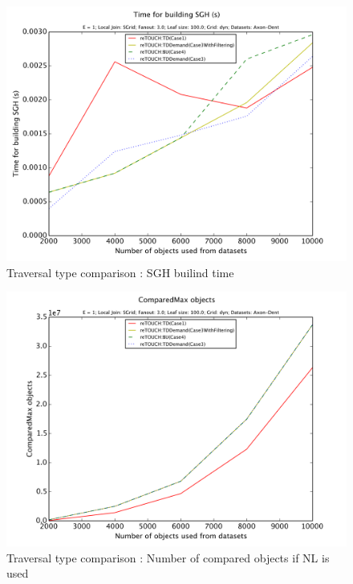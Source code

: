 \documentclass{sig-alternate}
\begin{document}
\begin{figure}[htb]
    \begin{center}
        \includegraphics[width=\columnwidth]{traversalTypeFixed/building}
        \caption{Traversal type comparison : SGH builind time}
        \label{fig:traversal:sghbuild}
      \end{center}
\end{figure}

\begin{figure}[htb]
    \begin{center}
        \includegraphics[width=\columnwidth]{traversalTypeFixed/NLjoin}
        \caption{Traversal type comparison : Number of compared objects if NL is used}
        \label{fig:traversal:compmax}
      \end{center}
\end{figure}
\end{document}
